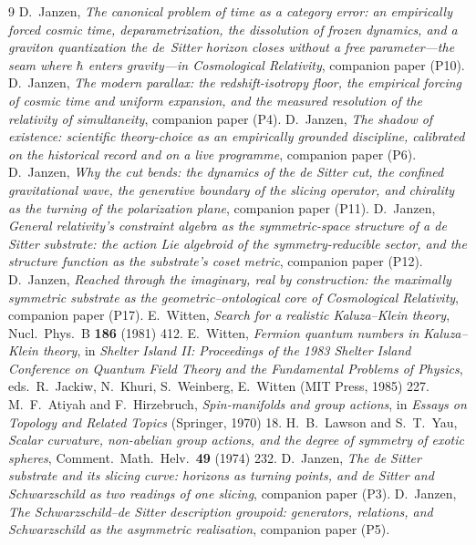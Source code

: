 \documentclass[11pt]{article}
\theoremstyle{plain}
\theoremstyle{remark}
\begin{document}
\begin{thebibliography}{9}
 D.~Janzen, \emph{The canonical problem of time as a category error: an empirically forced cosmic time, deparametrization, the dissolution of frozen dynamics, and a graviton quantization the de~Sitter horizon closes without a free parameter---the seam where $\hbar$ enters gravity---in Cosmological Relativity}, companion paper (P10).
 D.~Janzen, \emph{The modern parallax: the redshift-isotropy floor, the empirical forcing of cosmic time and uniform expansion, and the measured resolution of the relativity of simultaneity}, companion paper (P4).
 D.~Janzen, \emph{The shadow of existence: scientific theory-choice as an empirically grounded discipline, calibrated on the historical record and on a live programme}, companion paper (P6).
 D.~Janzen, \emph{Why the cut bends: the dynamics of the de Sitter cut, the confined gravitational wave, the generative boundary of the slicing operator, and chirality as the turning of the polarization plane}, companion paper (P11).
 D.~Janzen, \emph{General relativity's constraint algebra as the symmetric-space structure of a de Sitter substrate: the action Lie algebroid of the symmetry-reducible sector, and the structure function as the substrate's coset metric}, companion paper (P12).
 D.~Janzen, \emph{Reached through the imaginary, real by construction: the maximally symmetric substrate as the geometric--ontological core of Cosmological Relativity}, companion paper (P17).
 E.~Witten, \emph{Search for a realistic Kaluza--Klein theory}, Nucl.\ Phys.\ B \textbf{186} (1981) 412.
 E.~Witten, \emph{Fermion quantum numbers in Kaluza--Klein theory}, in \emph{Shelter Island II: Proceedings of the 1983 Shelter Island Conference on Quantum Field Theory and the Fundamental Problems of Physics}, eds.\ R.~Jackiw, N.~Khuri, S.~Weinberg, E.~Witten (MIT Press, 1985) 227.
 M.~F.~Atiyah and F.~Hirzebruch, \emph{Spin-manifolds and group actions}, in \emph{Essays on Topology and Related Topics} (Springer, 1970) 18.
 H.~B.~Lawson and S.~T.~Yau, \emph{Scalar curvature, non-abelian group actions, and the degree of symmetry of exotic spheres}, Comment.\ Math.\ Helv.\ \textbf{49} (1974) 232.
 D.~Janzen, \emph{The de Sitter substrate and its slicing curve: horizons as turning points, and de Sitter and Schwarzschild as two readings of one slicing}, companion paper (P3).
 D.~Janzen, \emph{The Schwarzschild--de Sitter description groupoid: generators, relations, and Schwarzschild as the asymmetric realisation}, companion paper (P5).

\end{thebibliography}
\end{document}
